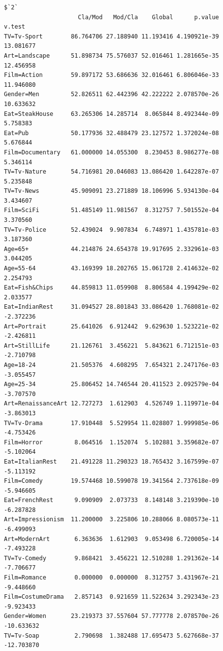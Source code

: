 \documentclass[
  letterpaper,
  DIV=11,
  numbers=noendperiod]{scrartcl}
\begin{document}
\begin{verbatim}
$`2`
                     Cla/Mod   Mod/Cla    Global      p.value     v.test
TV=Tv-Sport        86.764706 27.188940 11.193416 4.190921e-39  13.081677
Art=Landscape      51.898734 75.576037 52.016461 1.281665e-35  12.456958
Film=Action        59.897172 53.686636 32.016461 6.806046e-33  11.946080
Gender=Men         52.826511 62.442396 42.222222 2.078570e-26  10.633632
Eat=SteakHouse     63.265306 14.285714  8.065844 8.492344e-09   5.758383
Eat=Pub            50.177936 32.488479 23.127572 1.372024e-08   5.676844
Film=Documentary   61.000000 14.055300  8.230453 8.986277e-08   5.346114
TV=Tv-Nature       54.716981 20.046083 13.086420 1.642287e-07   5.235848
TV=Tv-News         45.909091 23.271889 18.106996 5.934130e-04   3.434607
Film=SciFi         51.485149 11.981567  8.312757 7.501552e-04   3.370560
TV=Tv-Police       52.439024  9.907834  6.748971 1.435781e-03   3.187360
Age=65+            44.214876 24.654378 19.917695 2.332961e-03   3.044205
Age=55-64          43.169399 18.202765 15.061728 2.414632e-02   2.254793
Eat=Fish&Chips     44.859813 11.059908  8.806584 4.199429e-02   2.033577
Eat=IndianRest     31.094527 28.801843 33.086420 1.768081e-02  -2.372236
Art=Portrait       25.641026  6.912442  9.629630 1.523221e-02  -2.426811
Art=StillLife      21.126761  3.456221  5.843621 6.712151e-03  -2.710798
Age=18-24          21.505376  4.608295  7.654321 2.247176e-03  -3.055457
Age=25-34          25.806452 14.746544 20.411523 2.092579e-04  -3.707570
Art=RenaissanceArt 12.727273  1.612903  4.526749 1.119971e-04  -3.863013
TV=Tv-Drama        17.910448  5.529954 11.028807 1.999985e-06  -4.753426
Film=Horror         8.064516  1.152074  5.102881 3.359682e-07  -5.102064
Eat=ItalianRest    21.491228 11.290323 18.765432 3.167599e-07  -5.113192
Film=Comedy        19.574468 10.599078 19.341564 2.737618e-09  -5.946605
Eat=FrenchRest      9.090909  2.073733  8.148148 3.219390e-10  -6.287828
Art=Impressionism  11.200000  3.225806 10.288066 8.080573e-11  -6.499093
Art=ModernArt       6.363636  1.612903  9.053498 6.720005e-14  -7.493228
TV=Tv-Comedy        9.868421  3.456221 12.510288 1.291362e-14  -7.706677
Film=Romance        0.000000  0.000000  8.312757 3.431967e-21  -9.448660
Film=CostumeDrama   2.857143  0.921659 11.522634 3.292343e-23  -9.923433
Gender=Women       23.219373 37.557604 57.777778 2.078570e-26 -10.633632
TV=Tv-Soap          2.790698  1.382488 17.695473 5.627668e-37 -12.703870


\end{verbatim}
\end{document}
